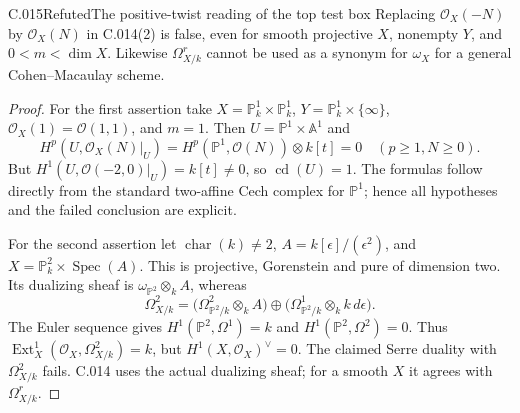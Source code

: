 \begin{saresult}{C.015}{Refuted}{The positive-twist reading of the top test box}
Replacing $\mathcal O_X(-N)$ by $\mathcal O_X(N)$ in C.014(2) is false,
even for smooth projective $X$, nonempty $Y$, and $0<m<\dim X$.
Likewise $\Omega^r_{X/k}$ cannot be used as a synonym for $\omega_X$
for a general Cohen--Macaulay scheme.
\end{saresult}
\begin{proof}
For the first assertion take
$X=\mathbb P^1_k\times\mathbb P^1_k$, $Y=\mathbb P^1_k\times\{\infty\}$,
$\mathcal O_X(1)=\mathcal O(1,1)$, and $m=1$.
Then $U=\mathbb P^1\times\mathbb A^1$ and
\[
 H^p(U,\mathcal O_X(N)|_U)
 =H^p(\mathbb P^1,\mathcal O(N))\otimes k[t]=0
 \quad(p\geq1, N\geq0).
\]
But $H^1(U,\mathcal O(-2,0)|_U)=k[t]\ne0$, so
$\operatorname{cd}(U)=1$.
The formulas follow directly from the standard two-affine Cech complex
for $\mathbb P^1$; hence all hypotheses and the failed conclusion are explicit.

For the second assertion let $\operatorname{char}(k)\ne2$,
$A=k[\epsilon]/(\epsilon^2)$, and
$X=\mathbb P^2_k\times\operatorname{Spec}(A)$.
This is projective, Gorenstein and pure of dimension two.
Its dualizing sheaf is $\omega_{\mathbb P^2}\otimes_k A$, whereas
\[
 \Omega^2_{X/k}
 =\bigl(\Omega^2_{\mathbb P^2/k}\otimes_k A\bigr)
 \oplus\bigl(\Omega^1_{\mathbb P^2/k}\otimes_k k\,d\epsilon\bigr).
\]
The Euler sequence gives $H^1(\mathbb P^2,\Omega^1)=k$ and
$H^1(\mathbb P^2,\Omega^2)=0$.
Thus $\operatorname{Ext}^1_X(\mathcal O_X,\Omega^2_{X/k})=k$, but
$H^1(X,\mathcal O_X)^\vee=0$. The claimed Serre duality with
$\Omega^2_{X/k}$ fails. C.014 uses the actual dualizing sheaf;
for a smooth $X$ it agrees with $\Omega^r_{X/k}$.
\end{proof}


